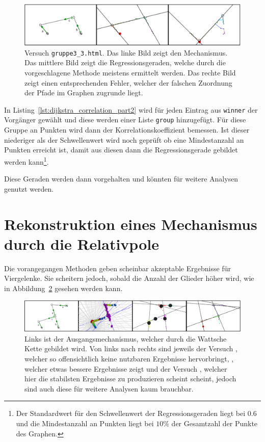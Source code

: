 \begin{figure}
    \centering
    \includegraphics[width=\textwidth]{gfx/correlation_edit.png}
    \caption[Versuch \lstinline{gruppe3_3.html}]{Versuch \lstinline{gruppe3_3.html}. Das linke Bild zeigt den Mechanismus. Das mittlere Bild zeigt die Regressionsgeraden, welche durch die vorgeschlagene Methode meistens ermittelt werden. Das rechte Bild zeigt einen entsprechenden Fehler, welcher der falschen Zuordnung der Pfade im Graphen zugrunde liegt.}
    \label{fig:gruppe3_3}
\end{figure}

In Listing~\ref{lst:dijkstra_correlation_part2} wird für jeden Eintrag aus \lstinline{winner} der Vorgänger gewählt und diese werden einer Liste \lstinline{group} hinzugefügt.
Für diese Gruppe an Punkten wird dann der Korrelationskoeffizient bemessen.
Ist dieser niederiger als der Schwellenwert wird noch geprüft ob eine Mindestanzahl an Punkten erreicht ist, damit aus diesen dann die Regressionsgerade gebildet werden kann\footnote{Der Standardwert für den Schwellenwert der Regressionsgeraden liegt bei $0.6$ und die Mindestanzahl an Punkten liegt bei $10\%$ der Gesamtzahl der Punkte des Graphen.}.

Diese Geraden werden dann vorgehalten und könnten für weitere Analysen genutzt werden.

\section{Rekonstruktion eines Mechanismus durch die Relativpole}

Die vorangegangen Methoden geben scheinbar akzeptable Ergebnisse für Viergelenke.
Sie scheitern jedoch, sobald die Anzahl der Glieder höher wird, wie in Abbildung~\ref{fig:gruppe1_3_2_6_3_4} gesehen werden kann.

\begin{figure}
    \includegraphics[width=\textwidth]{gfx/gruppe_failed_edit.png}
    \caption[Versuche ,  und .]{Links ist der Ausgangsmechanismus, welcher durch die Wattsche Kette gebildet wird. Von links nach rechts sind jeweils der Versuch , welcher so offensichtlich keine nutzbaren Ergebnisse hervorbringt, , welcher etwas bessere Ergebnisse zeigt und der Versuch , welcher hier die stabilsten Ergebnisse zu produzieren scheint scheint, jedoch sind auch diese für weitere Analysen kaum brauchbar.}
    \label{fig:gruppe1_3_2_6_3_4}
\end{figure}

